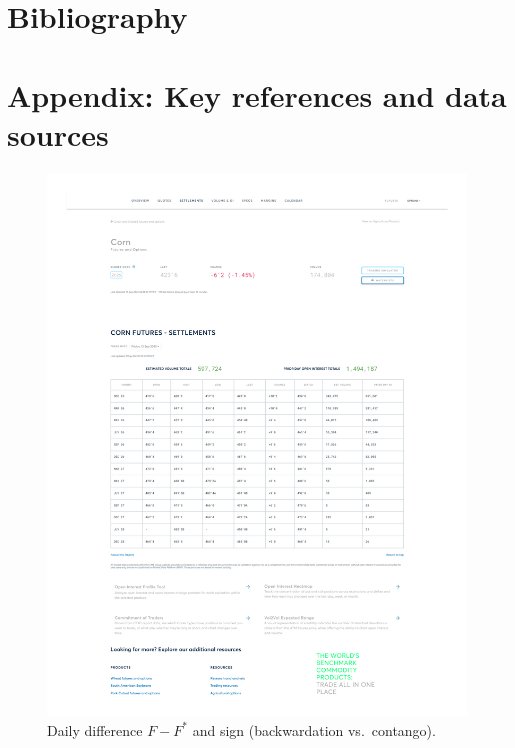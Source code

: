 \documentclass[10pt,a4paper]{article} %
\let\oldsection\section
\renewcommand{\section}{%
      \clearpage
      \thispagestyle{myfancy}%
      \oldsection
    }
\begin{document}
\section{Bibliography}



\section{Appendix: Key references and data sources}
\newpage

\begin{figure}[h]
  \centering
  \includegraphics[width=0.99\textwidth]{appendix/CORN12SEP.pdf}
  \caption{Daily difference \(F-F^{*}\) and sign (backwardation vs.\ contango).}
  \label{fig:corn_settlements}
\end{figure}
\end{document}
